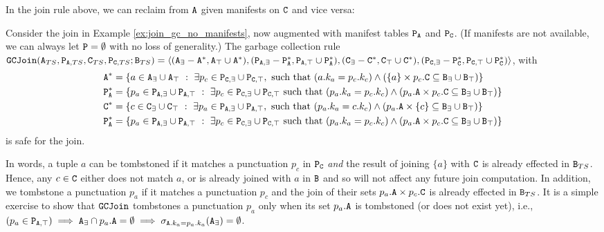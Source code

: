 In the join rule above, we can reclaim from $\tt{A}$ given manifests on $\tt{C}$ and vice versa:

\begin{example}
Consider the join in Example \ref{ex:join_gc_no_manifests}, now augmented with manifest tables $\tt{P}_\tt{A}$ and $\tt{P}_\tt{C}$.
(If manifests are not available, we can always let $\tt{P} = \emptyset$ with no loss of generality.)
The garbage collection rule $\tt{GCJoin}(\tt{A}_{TS}, \tt{P}_{\tt{A},TS}, \tt{C}_{TS}, \tt{P}_{\tt{C},TS}; \tt{B}_{TS}) = \langle (\tt{A}_\exists - \tt{A}^*, \tt{A}_\top \cup \tt{A}^*), (\tt{P}_{\tt{A},\exists} - \tt{P}_\tt{A}^*, \tt{P}_{\tt{A},\top} \cup \tt{P}_\tt{A}^*), (\tt{C}_\exists - \tt{C}^*, \tt{C}_\top \cup \tt{C}^*), (\tt{P}_{\tt{C},\exists} - \tt{P}_\tt{C}^*, \tt{P}_{\tt{C},\top} \cup \tt{P}_\tt{C}^*) \rangle$, with
\begin{align*}
\tt{A}^* &= \left\{a \in \tt{A}_\exists \cup \tt{A}_\top ~:~ \exists p_c \in \tt{P}_{\tt{C},\exists} \cup \tt{P}_{\tt{C},\top}, \text{ such that } (a.k_a = p_c.k_c) \wedge \left(\{a\} \times p_c.\tt{C} \subseteq \tt{B}_\exists \cup \tt{B}_\top\right)\right\}\\
\tt{P}_\tt{A}^* &= \{p_a \in \tt{P}_{\tt{A},\exists} \cup \tt{P}_{\tt{A},\top} ~:~ \exists p_c \in \tt{P}_{\tt{C},\exists} \cup \tt{P}_{\tt{C},\top} \text{ such that } (p_a.k_a = p_c.k_c) \wedge \left(p_a.\tt{A} \times p_c.\tt{C} \subseteq \tt{B}_\exists \cup \tt{B}_\top\right)\}\\
\tt{C}^* &= \left\{c \in \tt{C}_\exists \cup \tt{C}_\top ~:~ \exists p_a \in \tt{P}_{\tt{A},\exists} \cup \tt{P}_{\tt{A},\top}, \text{ such that } (p_a.k_a = c.k_c) \wedge \left(p_a.\tt{A} \times \{c\} \subseteq \tt{B}_\exists \cup \tt{B}_\top\right)\right\}\\
\tt{P}_\tt{A}^* &= \{p_a \in \tt{P}_{\tt{A},\exists} \cup \tt{P}_{\tt{A},\top} ~:~ \exists p_c \in \tt{P}_{\tt{C},\exists} \cup \tt{P}_{\tt{C},\top} \text{ such that } (p_a.k_a = p_c.k_c) \wedge \left(p_a.\tt{A} \times p_c.\tt{C} \subseteq \tt{B}_\exists \cup \tt{B}_\top\right)\}
\end{align*}
is safe for the join.
\end{example}
In words, a tuple $a$ can be tombstoned if it matches a punctuation $p_c$ in $\tt{P}_\tt{C}$ \emph{and} the result of joining $\{a\}$ with $\tt{C}$ is already effected in $\tt{B}_{TS}$.
Hence, any $c \in \tt{C}$ either does not match $a$, or is already joined with $a$ in $\tt{B}$ and so will not affect any future join computation.
In addition, we tombstone a punctuation $p_a$ if it matches a punctuation $p_c$ and the join of their sets $p_a.\tt{A} \times p_c.\tt{C}$ is already effected in $\tt{B}_{TS}$.
It is a simple exercise to show that $\tt{GCJoin}$ tombstones a punctuation $p_a$ only when its set $p_a.\tt{A}$ is tombstoned (or does not exist yet), i.e., $(p_a \in \tt{P}_{\tt{A},\top}) \implies \tt{A}_\exists \cap p_a.\tt{A} = \emptyset \implies \sigma_{\tt{A}.k_a = p_a.k_a}(\tt{A}_\exists) = \emptyset$.

